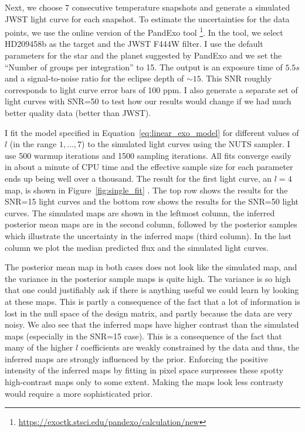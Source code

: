 \documentclass[12pt,dvipsnames]{report}
\begin{document}
Next, we choose 7 consecutive temperature snapshots and generate a simulated JWST light curve 
for each snapshot. To estimate the uncertainties for the data points, we use the
online version of the PandExo tool
\citep{2017PASP..129f4501B}\footnote{\url{https://exoctk.stsci.edu/pandexo/calculation/new}}. 
In the tool, we select HD209458b as the target and the JWST F444W filter. I use the default 
parameters for the star and the planet suggested by PandExo and we set the ``Number of 
groups per integration'' to 15. The output is an exposure time of $5.5s$ and a 
signal-to-noise ratio for the eclipse depth of $\sim 15$.  This SNR roughly corresponds to 
light curve error bars of 100 ppm.  I also generate a separate set of light curves with 
SNR=50 to test how our results would change if we had much better quality data 
(better than JWST).


I fit the model specified in Equation~\ref{eq:linear_exo_model} for different values of 
$l$ (in the range $1,\ldots,7$) to the simulated light curves using the NUTS sampler.
I use 500 warmup iterations and 1500 sampling iterations. All fits converge easily in 
about a minute of CPU time and the effective sample size for each parameter ends up being 
well over a thousand. The result for the first light curve, an $l=4$ map, is shown in 
Figure~\ref{fig:single_fit} .
The top row shows the results for the SNR=15 light curves and the bottom row shows the
results for the SNR=50 light curves. The simulated maps are shown in the leftmost 
column, the inferred posterior mean maps are in the second column, followed by 
the posterior samples which illustrate the uncertainty in the inferred maps (third column).
In the last column we plot the median predicted flux and the simulated light curves.

The posterior mean map in both cases does not look like the simulated map, and 
the variance in the posterior sample maps is quite high. 
The variance is so high that one could justifiably ask if there is anything useful we 
could learn by looking at these maps. 
This is partly a consequence 
of the fact that a lot of information is lost in the null space of the design matrix,
and partly because the data are very noisy. 
We also see that the inferred maps have higher contrast than the simulated maps 
(especially in the SNR=15 case). 
This is a consequence of the fact that many of the higher $l$
coefficients are weakly constrained by the data and thus, the inferred maps are 
strongly influenced by the prior. 
Enforcing the positive intensity of the inferred maps by fitting in pixel space 
surpresses these spotty high-contrast maps only to some extent.
Making the maps look less contrasty would require a more sophisticated prior.
\end{document}
